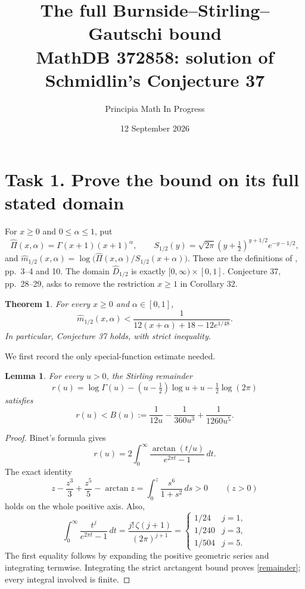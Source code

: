 \documentclass[11pt]{article}
\title{The full Burnside--Stirling--Gautschi bound\\
\large MathDB 372858: solution of Schmidlin's Conjecture 37}
\author{Principia Math In Progress}
\date{12 September 2026}
\newtheorem{theorem}{Theorem}
\newtheorem{lemma}{Lemma}
\begin{document}
\maketitle

\section*{Task 1. Prove the bound on its full stated domain}
For \(x\geq0\) and \(0\leq\alpha\leq1\), put
\[
 \widehat\Pi(x,\alpha)=\Gamma(x+1)(x+1)^\alpha,\qquad
 S_{1/2}(y)=\sqrt{2\pi}(y+\tfrac12)^{y+1/2}e^{-y-1/2},
\]
and \(\widehat m_{1/2}(x,\alpha)=
\log\bigl(\widehat\Pi(x,\alpha)/S_{1/2}(x+\alpha)\bigr)\).
These are the definitions of \cite{Schmidlin}, pp.~3--4 and 10.
The domain \(\widehat D_{1/2}\) is exactly
\([0,\infty)\times[0,1]\). Conjecture 37, pp.~28--29, asks
to remove the restriction \(x\geq1\) in Corollary 32.

\begin{theorem}
For every \(x\geq0\) and \(\alpha\in[0,1]\),
\begin{equation}\label{target}
 \widehat m_{1/2}(x,\alpha)
 < \frac{1}{12(x+\alpha)+18-12e^{1/48}}.
\end{equation}
In particular, Conjecture 37 holds, with strict inequality.
\end{theorem}

We first record the only special-function estimate needed.
\begin{lemma}\label{binet}
For every \(u>0\), the Stirling remainder
\[
 r(u)=\log\Gamma(u)-(u-\tfrac12)\log u+u-\tfrac12\log(2\pi)
\]
satisfies
\begin{equation}\label{remainder}
 r(u)<B(u):=\frac1{12u}-\frac1{360u^3}+\frac1{1260u^5}.
\end{equation}
\end{lemma}
\begin{proof}
Binet's formula \cite[Eq.~5.9.10]{DLMF} gives
\[
 r(u)=2\int_0^\infty\frac{\arctan(t/u)}{e^{2\pi t}-1}\,dt.
\]
The exact identity
\[
 z-\frac{z^3}{3}+\frac{z^5}{5}-\arctan z
 =\int_0^z\frac{s^6}{1+s^2}\,ds>0\qquad(z>0)
\]
holds on the whole positive axis. Also,
\[
 \int_0^\infty\frac{t^j}{e^{2\pi t}-1}\,dt
 =\frac{j!\,\zeta(j+1)}{(2\pi)^{j+1}}
 =\begin{cases}1/24&j=1,\\1/240&j=3,\\1/504&j=5.\end{cases}
\]
The first equality follows by expanding the positive geometric series
and integrating termwise. Integrating the strict arctangent bound proves
\eqref{remainder}; every integral involved is finite.
\end{proof}
\end{document}
